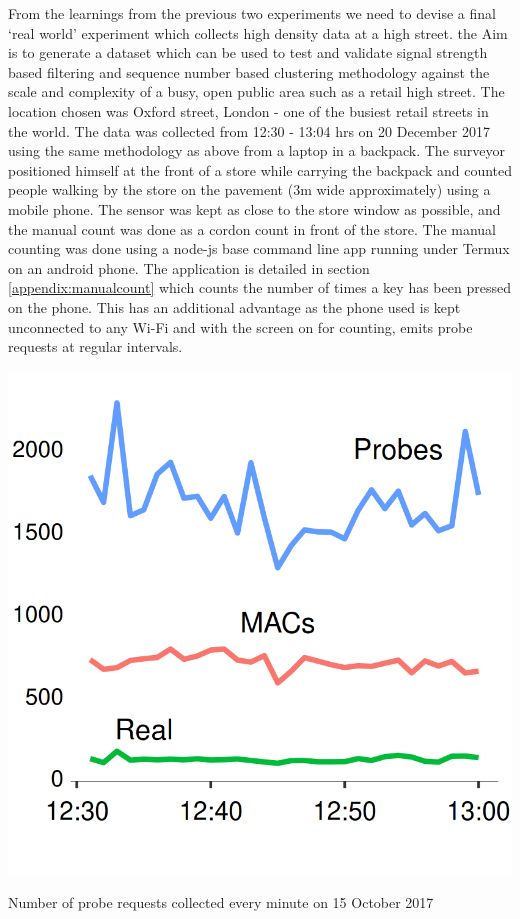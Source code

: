 From the learnings from the previous two experiments we need to devise a final `real world' experiment which collects high density data at a high street.
the Aim is to generate a dataset which can be used to test and validate signal strength based filtering and sequence number based clustering methodology against the scale and complexity of a busy, open public area such as a retail high street.
The location chosen was Oxford street, London - one of the busiest retail streets in the world.
The data was collected from 12:30 - 13:04 hrs on 20 December 2017 using the same methodology as above from a laptop in a backpack.
The surveyor positioned himself at the front of a store while carrying the backpack and counted people walking by the store on the pavement (3m wide approximately) using a mobile phone.
The sensor was kept as close to the store window as possible, and the manual count was done as a cordon count in front of the store.
The manual counting was done using a node-js base command line app running under Termux on an android phone.
The application is detailed in section \ref{appendix:manualcount} which counts the number of times a key has been pressed on the phone.
This has an additional advantage as the phone used is kept unconnected to any Wi-Fi and with the screen on for counting, emits probe requests at regular intervals.

\begin{marginfigure}
  \includegraphics[trim={0 0 0 0},clip]{images/oxst-counts.png}
  \caption{Number of probe requests collected every minute on 15 October 2017}
  \label{figure:collection:ucl:config}
\end{marginfigure}


